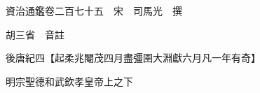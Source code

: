 










 


 
 


 

  
  
  
  
  





  
  
  
  
  
 
  

  

  
  
  



  

 
 

  
   




  

  
  


  　　資治通鑑卷二百七十五　宋　司馬光　撰

　　胡三省　音註

　　後唐紀四【起柔兆閹茂四月盡彊圉大淵獻六月凡一年有奇】

　　明宗聖德和武欽孝皇帝上之下

